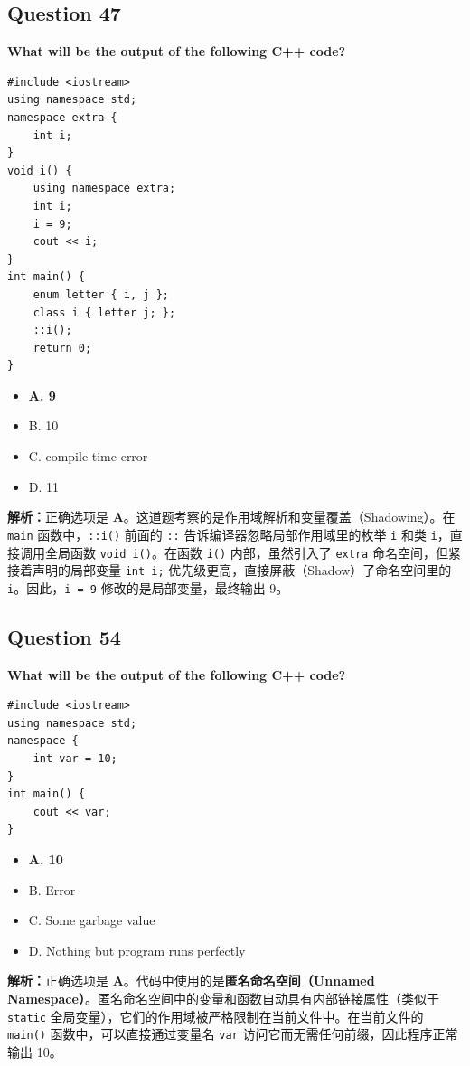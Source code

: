 \documentclass[11pt, a4paper]{article}
\begin{document}

\subsection*{Question 47}
\textbf{What will be the output of the following C++ code?}
\begin{verbatim}
#include <iostream>
using namespace std;
namespace extra {
    int i;
}
void i() {
    using namespace extra;
    int i;
    i = 9;
    cout << i;
}
int main() {
    enum letter { i, j };
    class i { letter j; };
    ::i();
    return 0;
}
\end{verbatim}
\begin{itemize}
    \item \textbf{A. 9}
    \item B. 10
    \item C. compile time error
    \item D. 11
\end{itemize}

\textbf{解析：}正确选项是 \textbf{A}。这道题考察的是作用域解析和变量覆盖（Shadowing）。在 \texttt{main} 函数中，\texttt{::i()} 前面的 \texttt{::} 告诉编译器忽略局部作用域里的枚举 \texttt{i} 和类 \texttt{i}，直接调用全局函数 \texttt{void i()}。在函数 \texttt{i()} 内部，虽然引入了 \texttt{extra} 命名空间，但紧接着声明的局部变量 \texttt{int i;} 优先级更高，直接屏蔽（Shadow）了命名空间里的 \texttt{i}。因此，\texttt{i = 9} 修改的是局部变量，最终输出 9。


\subsection*{Question 54}
\textbf{What will be the output of the following C++ code?}
\begin{verbatim}
#include <iostream>
using namespace std;
namespace {
    int var = 10;
}
int main() {
    cout << var;
}
\end{verbatim}
\begin{itemize}
    \item \textbf{A. 10}
    \item B. Error
    \item C. Some garbage value
    \item D. Nothing but program runs perfectly
\end{itemize}

\textbf{解析：}正确选项是 \textbf{A}。代码中使用的是\textbf{匿名命名空间（Unnamed Namespace）}。匿名命名空间中的变量和函数自动具有内部链接属性（类似于 \texttt{static} 全局变量），它们的作用域被严格限制在当前文件中。在当前文件的 \texttt{main()} 函数中，可以直接通过变量名 \texttt{var} 访问它而无需任何前缀，因此程序正常输出 10。
\end{document}
